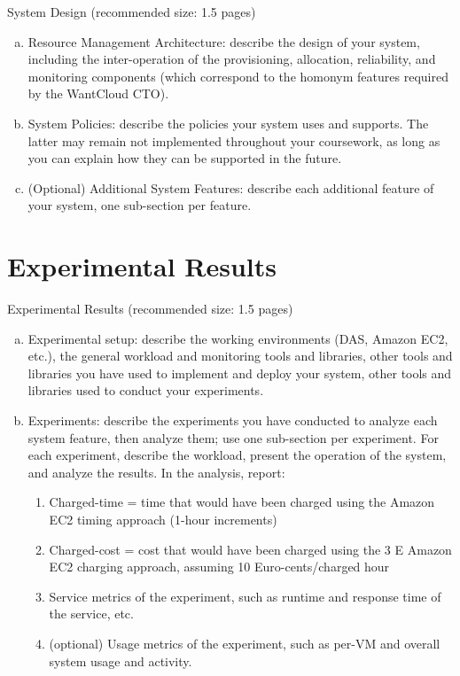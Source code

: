 \documentclass[twoside]{article}
\begin{document}
\begin{multicols}{2}
System Design (recommended size: 1.5 pages)
\begin{enumerate}[(a)]
\item Resource Management Architecture: describe the design of your system,
including the inter-operation of the provisioning, allocation, reliability, and monitoring components (which correspond to the homonym features required by the WantCloud CTO).
\item System Policies: describe the policies your system uses and supports. The latter may remain not implemented throughout your coursework, as long as you can explain how they can be supported in the future.
\item (Optional) Additional System Features: describe each additional feature of your system, one sub-section per feature.
\end{enumerate}


\section{Experimental Results}
Experimental Results (recommended size: 1.5 pages)
\begin{enumerate}[(a)]
\item Experimental setup: describe the working environments (DAS, Amazon EC2,
etc.), the general workload and monitoring tools and libraries, other tools and libraries you have used to implement and deploy your system, other tools and libraries used to conduct your experiments.
\item Experiments: describe the experiments you have conducted to analyze each system feature, then analyze them; use one sub-section per experiment. For each experiment, describe the workload, present the operation of the system, and analyze the results. In the analysis, report:
\begin{enumerate}
\item Charged-time = time that would have been charged using the Amazon EC2 timing approach (1-hour increments)
\item Charged-cost = cost that would have been charged using the 3
E
Amazon EC2 charging approach, assuming 10 Euro-cents/charged hour
\item Service metrics of the experiment, such as runtime and response time of
the service, etc.
\item (optional) Usage metrics of the experiment, such as per-VM and overall
system usage and activity.
\end{enumerate}
\end{enumerate}


\end{multicols}
\end{document}
